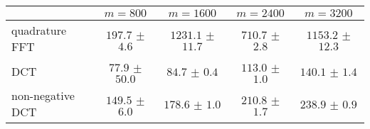 \centering
\renewcommand{\arraystretch}{1.2}
\begin{tabular}{@{}lcccc@{}}
\toprule
 & $m=800$ & $m=1600$ & $m=2400$ & $m=3200$\\
\midrule
quadrature FFT & $197.7$ $\pm$ $4.6$ & $1231.1$ $\pm$ $11.7$ & $710.7$ $\pm$ $2.8$ & $1153.2$ $\pm$ $12.3$ \\
DCT & $77.9$ $\pm$ $50.0$ & $84.7$ $\pm$ $0.4$ & $113.0$ $\pm$ $1.0$ & $140.1$ $\pm$ $1.4$ \\
non-negative DCT & $149.5$ $\pm$ $6.0$ & $178.6$ $\pm$ $1.0$ & $210.8$ $\pm$ $1.7$ & $238.9$ $\pm$ $0.9$ \\
\bottomrule
\end{tabular}
